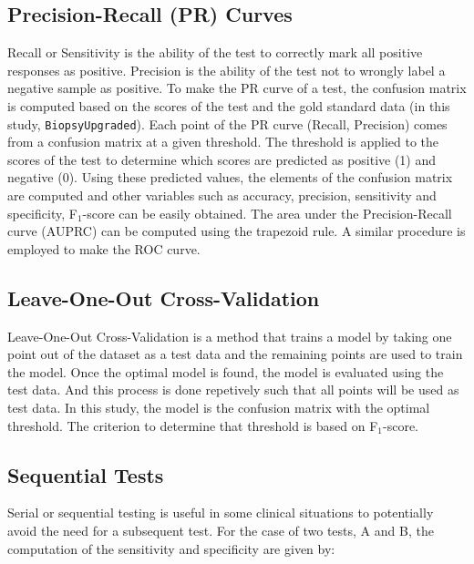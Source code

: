 \documentclass[]{article}
\begin{document}
\subsection{Precision-Recall (PR) Curves}

\noindent Recall or Sensitivity is the ability of the test to correctly mark all positive responses 
as positive. Precision is the ability of the test not to wrongly label a negative sample as positive. 
To make the PR curve of a test, the confusion matrix is computed based on the scores of the test 
and the gold standard data (in this study, \verb|BiopsyUpgraded|). Each point of the PR curve (Recall, Precision)
comes from a confusion matrix at a given threshold. The threshold is applied to the scores of the test to determine
which scores are predicted as positive (1) and negative (0). Using these predicted values, the elements of the 
confusion matrix are computed and other variables such as accuracy, precision, sensitivity and specificity, 
F$_{1}$-score can be easily obtained. The area under the Precision-Recall curve (AUPRC) can be computed using 
the trapezoid rule. A similar procedure is employed to make the ROC curve. \\

\subsection{Leave-One-Out Cross-Validation}

\noindent Leave-One-Out Cross-Validation is a method that trains a model by taking one point out of the dataset 
as a test data and the remaining points are used to train the model. Once the optimal model is found, 
the model is evaluated using the test data. And this process is done repetively such that all points 
will be used as test data. In this study, the model is the confusion matrix with the optimal threshold.
The criterion to determine that threshold is based on F$_{1}$-score.  \\

\subsection{Sequential Tests}

\noindent Serial or sequential testing is useful in some clinical situations to potentially avoid 
the need for a subsequent test. For the case of two tests, A and B, the computation of the sensitivity 
and specificity are given by: \\
\end{document}
